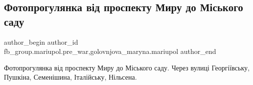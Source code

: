  
 
 
 
 

\subsection{Фотопрогулянка від проспекту Миру до Міського саду}
\label{sec:20_03_2023.fb.fb_group.mariupol.pre_war.1.fotoprogulyanka_v_d_}
 
\ifcmt
 author_begin
   author_id fb_group.mariupol.pre_war,golovnjova_maryna.mariupol
 author_end
\fi

Фотопрогулянка від проспекту Миру до Міського саду.
Через вулиці Георгіївську, Пушкіна, Семенішина, Італійську, Нільсена.

